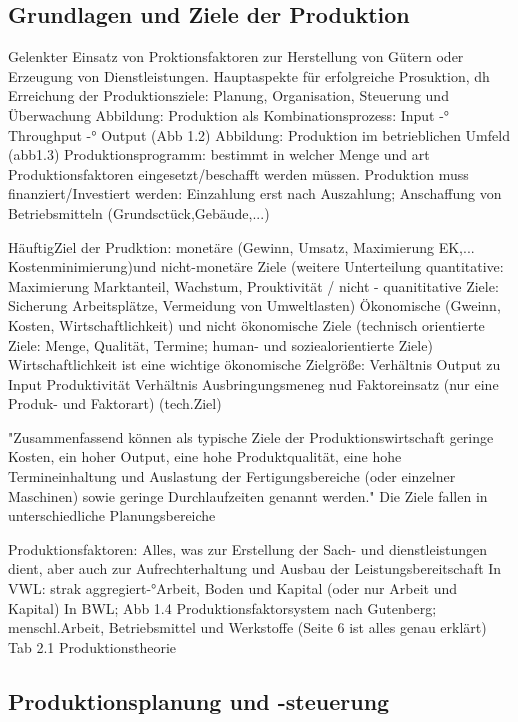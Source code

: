 \documentclass[a4paper,12pt, german]{report}
\begin{document}
\subsection{Grundlagen und Ziele der Produktion}


Gelenkter Einsatz von Proktionsfaktoren zur Herstellung von Gütern oder Erzeugung von Dienstleistungen. Hauptaspekte für erfolgreiche Prosuktion, dh Erreichung der Produktionsziele: Planung, Organisation, Steuerung und Überwachung 
Abbildung: Produktion als Kombinationsprozess: Input -° Throughput -° Output (Abb 1.2)
Abbildung: Produktion im betrieblichen Umfeld (abb1.3)
Produktionsprogramm: bestimmt in welcher Menge und art Produktionsfaktoren eingesetzt/beschafft werden müssen.
Produktion muss finanziert/Investiert werden: Einzahlung erst nach Auszahlung; Anschaffung von Betriebsmitteln (Grundsctück,Gebäude,...)
\cite{07}

HäuftigZiel der Prudktion: monetäre (Gewinn, Umsatz, Maximierung EK,... Kostenminimierung)und nicht-monetäre Ziele (weitere Unterteilung quantitative: Maximierung Marktanteil, Wachstum, Prouktivität / nicht - quanititative Ziele: Sicherung Arbeitsplätze, Vermeidung von Umweltlasten) 
Ökonomische (Gweinn, Kosten, Wirtschaftlichkeit) und nicht ökonomische Ziele (technisch orientierte Ziele: Menge, Qualität, Termine; human- und soziealorientierte Ziele)
Wirtschaftlichkeit ist eine wichtige ökonomische Zielgröße: Verhältnis Output zu Input
Produktivität Verhältnis Ausbringungsmeneg nud Faktoreinsatz (nur eine Produk- und Faktorart) (tech.Ziel)

"Zusammenfassend können als typische Ziele der Produktionswirtschaft geringe Kosten,
ein hoher Output, eine hohe Produktqualität, eine hohe Termineinhaltung und Auslastung
der Fertigungsbereiche (oder einzelner Maschinen) sowie geringe Durchlaufzeiten
genannt werden." Die Ziele fallen in unterschiedliche Planungsbereiche

Produktionsfaktoren: 
Alles, was zur Erstellung der Sach- und dienstleistungen dient, aber auch zur Aufrechterhaltung und Ausbau der Leistungsbereitschaft
In VWL: strak aggregiert-°Arbeit, Boden und Kapital (oder nur Arbeit und Kapital)
In BWL; Abb 1.4 Produktionsfaktorsystem nach Gutenberg; menschl.Arbeit, Betriebsmittel und Werkstoffe (Seite 6 ist alles genau erklärt)
Tab 2.1 Produktionstheorie

\subsection{Produktionsplanung und -steuerung}
\end{document}
